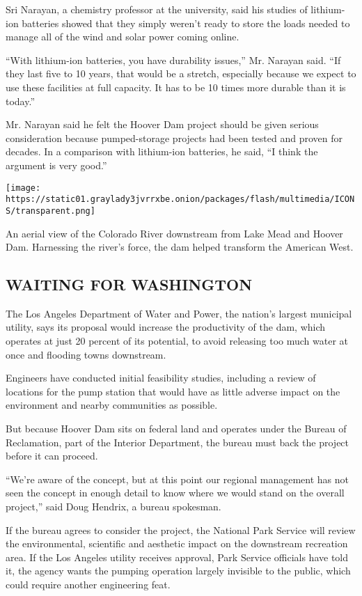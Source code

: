 Sri Narayan, a chemistry professor at the university, said his studies
of lithium-ion batteries showed that they simply weren't ready to store
the loads needed to manage all of the wind and solar power coming
online.

``With lithium-ion batteries, you have durability issues,'' Mr. Narayan
said. ``If they last five to 10 years, that would be a stretch,
especially because we expect to use these facilities at full capacity.
It has to be 10 times more durable than it is today.''

Mr. Narayan said he felt the Hoover Dam project should be given serious
consideration because pumped-storage projects had been tested and proven
for decades. In a comparison with lithium-ion batteries, he said, ``I
think the argument is very good.''

\texttt{[image: https://static01.graylady3jvrrxbe.onion/packages/flash/multimedia/ICONS/transparent.png]}

An aerial view of the Colorado River downstream from Lake Mead and
Hoover Dam. Harnessing the river's force, the dam helped transform the
American West.

\hypertarget{waiting-for-washington}{%
\subsection{WAITING FOR WASHINGTON}\label{waiting-for-washington}}

The Los Angeles Department of Water and Power, the nation's largest
municipal utility, says its proposal would increase the productivity of
the dam, which operates at just 20 percent of its potential, to avoid
releasing too much water at once and flooding towns downstream.

Engineers have conducted initial feasibility studies, including a review
of locations for the pump station that would have as little adverse
impact on the environment and nearby communities as possible.

But because Hoover Dam sits on federal land and operates under the
Bureau of Reclamation, part of the Interior Department, the bureau must
back the project before it can proceed.

``We're aware of the concept, but at this point our regional management
has not seen the concept in enough detail to know where we would stand
on the overall project,'' said Doug Hendrix, a bureau spokesman.

If the bureau agrees to consider the project, the National Park Service
will review the environmental, scientific and aesthetic impact on the
downstream recreation area. If the Los Angeles utility receives
approval, Park Service officials have told it, the agency wants the
pumping operation largely invisible to the public, which could require
another engineering feat.

